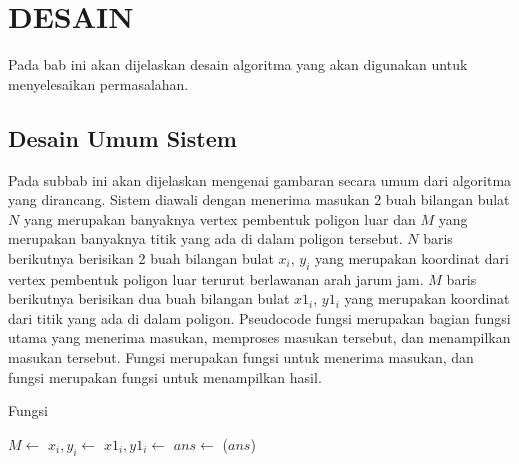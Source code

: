 \chapter{DESAIN}
\label{sec:desain}
Pada bab ini akan dijelaskan desain algoritma yang akan digunakan untuk menyelesaikan permasalahan.

\section{Desain Umum Sistem}
Pada subbab ini akan dijelaskan mengenai gambaran secara umum dari algoritma yang dirancang. Sistem diawali dengan menerima masukan 2 buah bilangan bulat $N$ yang merupakan banyaknya vertex pembentuk poligon luar dan $M$ yang merupakan banyaknya titik yang ada di dalam poligon tersebut. $N$ baris berikutnya berisikan 2 buah bilangan bulat $x_i$, $y_i$ yang merupakan koordinat dari vertex pembentuk poligon luar terurut berlawanan arah jarum jam. $M$ baris berikutnya berisikan dua buah bilangan bulat $x1_i$, $y1_i$ yang merupakan koordinat dari titik yang ada di dalam poligon. Pseudocode fungsi  merupakan bagian fungsi utama yang menerima masukan, memproses masukan tersebut, dan menampilkan masukan tersebut. Fungsi  merupakan fungsi untuk menerima masukan, dan fungsi  merupakan fungsi untuk menampilkan hasil. 

\begin{algorithm}
	\caption{Fungsi }
	\label{psdo:function_main}
    \begin{algorithmic}[1]
            \State $M \leftarrow$ 
                \State $ x_i , y_i \leftarrow $ 
            \EndFor
                \State $ x1_i , y1_i \leftarrow $ 
            \EndFor
            \State $ans \leftarrow $
            \State {} ($ans $)
        \EndWhile
	\end{algorithmic}
\end{algorithm}
